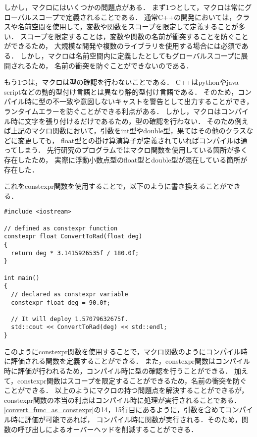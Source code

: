 しかし，マクロにはいくつかの問題点がある．
まず1つとして，マクロは常にグローバルスコープで定義されることである．
通常C++の開発においては，クラスや名前空間を使用して，変数や関数をスコープを限定して定義することが多い．
スコープを限定することは，変数や関数の名前が衝突することを防ぐことができるため，
大規模な開発や複数のライブラリを使用する場合には必須である．
しかし，マクロは名前空間内に定義したとしてもグローバルスコープに展開されるため，
名前の衝突を防ぐことができないのである．

もう1つは，マクロは型の確認を行わないことである．
C++はpythonやjava scriptなどの動的型付け言語とは異なり静的型付け言語である．
そのため，コンパイル時に型の不一致や意図しないキャストを警告として出力することができ，
ランタイムエラーを防ぐことができる利点がある．
しかし，マクロはコンパイル時に文字を張り付けるだけであるため，型の確認を行わない．
そのため例えば上記のマクロ関数において，引数をint型やdouble型，果てはその他のクラスなどに変更しても，
float型との掛け算演算子が定義されていればコンパイルは通ってしまう．
先行研究のプログラムではマクロ関数を使用している箇所が多く存在したため，
実際に浮動小数点型のfloat型とdouble型が混在している箇所が存在した．

これをconstexpr関数を使用することで，以下のように書き換えることができる．

\begin{lstlisting}[caption=convert func as constexpr,label=convert_func_as_constexpr]
#include <iostream>

// defined as constexpr function
constexpr float ConvertToRad(float deg)
{
  return deg * 3.1415926535f / 180.0f;
}

int main()
{
  // declared as constexpr variable
  constexpr float deg = 90.0f;
  
  // It will deploy 1.57079632675f.
  std::cout << ConvertToRad(deg) << std::endl;
}
\end{lstlisting}

このようにconstexpr関数を使用することで，マクロ関数のようにコンパイル時に評価される関数を定義することができる．
また，constexpr関数はコンパイル時に評価が行われるため，コンパイル時に型の確認を行うことができる．
加えて，constexpr関数はスコープを限定することができるため，名前の衝突を防ぐことができる．
以上のようにマクロの持つ問題点を解決することができるが，constexpr関数の本当の利点はコンパイル時に処理が実行されることである．
\ref{convert_func_as_constexpr}の14，15行目にあるように，引数を含めてコンパイル時に評価が可能であれば，
コンパイル時に関数が実行される．そのため，関数の呼び出しによるオーバーヘッドを削減することができる．

